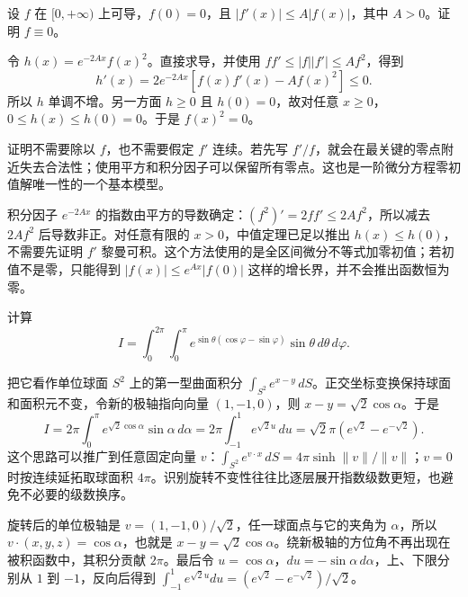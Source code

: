 \documentclass[12pt,fontset=fandol]{ctexart}
\begin{document}
\begin{example}\label{nm-2019-3}
设 $f$ 在 $[0,+\infty)$ 上可导，$f(0)=0$，且 $|f'(x)|\leq A|f(x)|$，其中 $A>0$。证明 $f\equiv0$。
\end{example}
\begin{solve}
令 $h(x)=e^{-2Ax}f(x)^2$。直接求导，并使用 $f f'\leq |f||f'|\leq A f^2$，得到
\[
 h'(x)=2e^{-2Ax}[f(x)f'(x)-Af(x)^2]\leq0.
\]
所以 $h$ 单调不增。另一方面 $h\geq0$ 且 $h(0)=0$，故对任意 $x\geq0$，$0\leq h(x)\leq h(0)=0$。于是 $f(x)^2=0$。

证明不需要除以 $f$，也不需要假定 $f'$ 连续。若先写 $f'/f$，就会在最关键的零点附近失去合法性；使用平方和积分因子可以保留所有零点。这也是一阶微分方程零初值解唯一性的一个基本模型。

积分因子 $e^{-2Ax}$ 的指数由平方的导数确定：$(f^2)'=2ff'\le2Af^2$，所以减去 $2Af^2$ 后导数非正。对任意有限的 $x>0$，中值定理已足以推出 $h(x)\le h(0)$，不需要先证明 $f'$ 黎曼可积。这个方法使用的是全区间微分不等式加零初值；若初值不是零，只能得到 $|f(x)|\le e^{Ax}|f(0)|$ 这样的增长界，并不会推出函数恒为零。

\end{solve}

\begin{example}\label{nm-2019-4}
计算
\[
 I=\int_0^{2\pi}\int_0^\pi
 e^{\sin\theta(\cos\varphi-\sin\varphi)}\sin\theta\,d\theta\,d\varphi.
\]
\end{example}
\begin{solve}
把它看作单位球面 $S^2$ 上的第一型曲面积分 $\int_{S^2}e^{x-y}\,dS$。正交坐标变换保持球面和面积元不变，令新的极轴指向向量 $(1,-1,0)$，则 $x-y=\sqrt2\cos\alpha$。于是
\[
 I=2\pi\int_0^\pi e^{\sqrt2\cos\alpha}\sin\alpha\,d\alpha
 =2\pi\int_{-1}^1e^{\sqrt2 u}\,du
 =\sqrt2\pi(e^{\sqrt2}-e^{-\sqrt2}).
\]
这个思路可以推广到任意固定向量 $v$：$\int_{S^2}e^{v\cdot x}\,dS=4\pi\sinh\|v\|/\|v\|$；$v=0$ 时按连续延拓取球面积 $4\pi$。识别旋转不变性往往比逐层展开指数级数更短，也避免不必要的级数换序。

旋转后的单位极轴是 $v=(1,-1,0)/\sqrt2$，任一球面点与它的夹角为 $\alpha$，所以 $v\cdot(x,y,z)=\cos\alpha$，也就是 $x-y=\sqrt2\cos\alpha$。绕新极轴的方位角不再出现在被积函数中，其积分贡献 $2\pi$。最后令 $u=\cos\alpha$，$du=-\sin\alpha\,d\alpha$，上、下限分别从 $1$ 到 $-1$，反向后得到 $\int_{-1}^1e^{\sqrt2u}du=(e^{\sqrt2}-e^{-\sqrt2})/\sqrt2$。

\end{solve}
\end{document}
